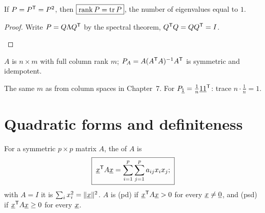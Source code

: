 \begin{corollary}
If $P=P^{\mathsf{T}}=P^2$, then $\boxed{\operatorname{rank} P=\operatorname{tr} P}$, the number of eigenvalues equal to $1$.
\end{corollary}
\begin{proof}
Write $P=Q\Lambda Q^{\mathsf{T}}$ by the spectral theorem, $Q^{\mathsf{T}} Q=QQ^{\mathsf{T}}=I$.
\begin{deriv}
\end{deriv}
\end{proof}

\begin{example}
$A$ is $n\times m$ with full column rank $m$; $P_A=A(A^{\mathsf{T}} A)^{-1}A^{\mathsf{T}}$ is symmetric and idempotent.
\begin{deriv}
\end{deriv}
The same $m$ as from column spaces in Chapter~7. For $P_{\underline{1}}=\frac1n\underline{1}\underline{1}^{\mathsf{T}}$: trace $n\cdot\frac1n=1$.
\end{example}

\section{Quadratic forms and definiteness}

\begin{definition}
For a symmetric $p\times p$ matrix $A$, the  of $A$ is
\[
  \boxed{\;\underline{x}^{\mathsf{T}} A\underline{x}=\sum_{i=1}^p\sum_{j=1}^pa_{ij}x_ix_j;\;}
\]
with $A=I$ it is $\sum_ix_i^2=\|\underline{x}\|^2$. $A$ is  (pd) if $\underline{x}^{\mathsf{T}} A\underline{x}>0$ for every $\underline{x}\ne\underline{0}$, and  (psd) if $\underline{x}^{\mathsf{T}} A\underline{x}\ge0$ for every $\underline{x}$.
\end{definition}

